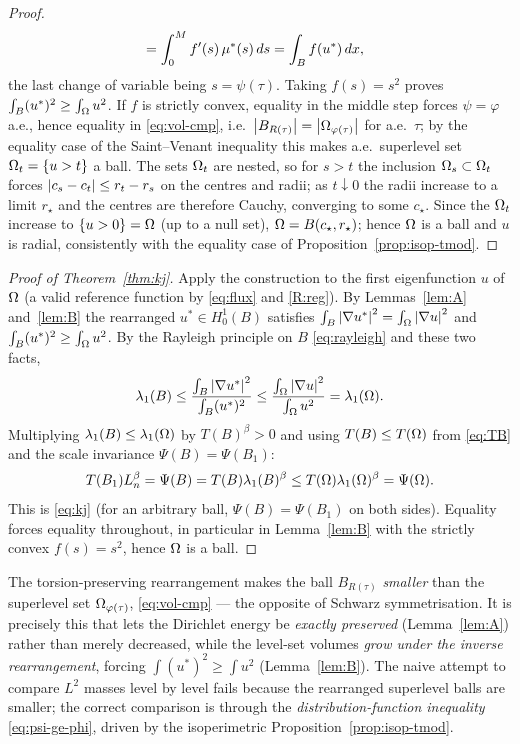 \begin{proof}
\begin{align*}
  &=\int_0^M f'(s)\,\mu^*(s)\,ds=\int_B f(u^*)\,dx,
\end{align*}
the last change of variable being $s=\psi(\tau)$. Taking $f(s)=s^2$ proves
$\int_B(u^*)^2\ge\int_\Omega u^2$. If $f$ is strictly convex, equality in the
middle step forces $\psi=\varphi$ a.e., hence equality in
\eqref{eq:vol-cmp}, i.e.\ $\left|B_{R(\tau)}\right|=\left|\Omega_{\varphi(\tau)}\right|$ for
a.e.\ $\tau$; by the equality case of the Saint--Venant inequality this
makes a.e.\ superlevel set $\Omega_t=\{u>t\}$ a ball. The sets $\Omega_t$ are
nested, so for $s>t$ the inclusion $\Omega_s\subset\Omega_t$ forces
$\left|c_s-c_t\right|\le r_t-r_s$ on the centres and radii; as $t\downarrow0$ the
radii increase to a limit $r_\star$ and the centres are therefore Cauchy,
converging to some $c_\star$. Since the $\Omega_t$ increase to $\{u>0\}=\Omega$ (up
to a null set), $\Omega=B(c_\star,r_\star)$; hence $\Omega$ is a ball and $u$ is
radial, consistently with the equality case of
Proposition~\ref{prop:isop-tmod}.
\end{proof}

\begin{proof}[Proof of Theorem~\ref{thm:kj}]
Apply the construction to the first eigenfunction $u$ of $\Omega$ (a valid
reference function by \eqref{eq:flux} and \ref{R:reg}). By
Lemmas~\ref{lem:A} and~\ref{lem:B} the rearranged $u^*\in H^1_0(B)$
satisfies $\int_B\left|\nabla u^*\right|^2=\int_\Omega\left|\nabla u\right|^2$ and
$\int_B(u^*)^2\ge\int_\Omega u^2$. By the Rayleigh principle on $B$
\eqref{eq:rayleigh} and these two facts,
\[
  \lambda_1(B)\le
  \frac{\int_B\left|\nabla u^*\right|^2}{\int_B(u^*)^2}
  \le\frac{\int_\Omega\left|\nabla u\right|^2}{\int_\Omega u^2}
  =\lambda_1(\Omega).
\]
Multiplying $\lambda_1(B)\le\lambda_1(\Omega)$ by $T(B)^\beta>0$ and using
$T(B)\le T(\Omega)$ from \eqref{eq:TB} and the scale invariance
$\Psi(B)=\Psi(B_1)$:
\[
  T(B_1)L_n^\beta=\Psi(B)=T(B)\lambda_1(B)^\beta
  \le T(\Omega)\lambda_1(\Omega)^\beta=\Psi(\Omega).
\]
This is \eqref{eq:kj} (for an arbitrary ball, $\Psi(B)=\Psi(B_1)$ on both
sides). Equality forces equality throughout, in particular in
Lemma~\ref{lem:B} with the strictly convex $f(s)=s^2$, hence $\Omega$ is a
ball.
\end{proof}

\begin{remark}
\label{rem:sign}
The torsion-preserving rearrangement makes the ball
$B_{R(\tau)}$ \emph{smaller} than the superlevel set
$\Omega_{\varphi(\tau)}$, \eqref{eq:vol-cmp} — the opposite of Schwarz
symmetrisation. It is precisely this that lets the Dirichlet energy be
\emph{exactly preserved} (Lemma~\ref{lem:A}) rather than merely decreased,
while the level-set volumes \emph{grow under the inverse rearrangement},
forcing $\int(u^*)^2\ge\int u^2$ (Lemma~\ref{lem:B}). The naive attempt to
compare $L^2$ masses level by level fails because the rearranged superlevel
balls are smaller; the correct comparison is through the
\emph{distribution-function inequality} \eqref{eq:psi-ge-phi}, driven by the
isoperimetric Proposition~\ref{prop:isop-tmod}.
\end{remark}

